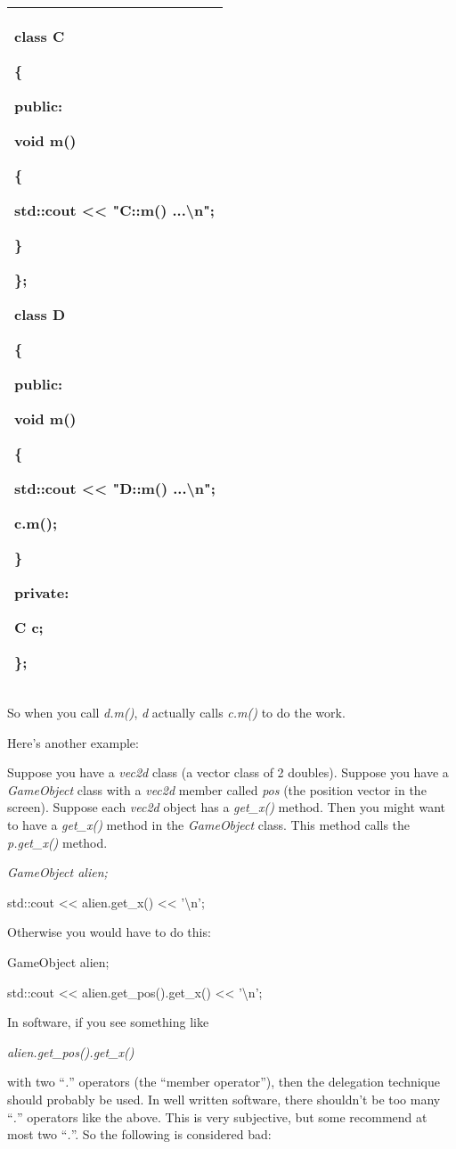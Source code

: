 \documentclass[
]{article}
\begin{document}
\begin{longtable}[]{@{}l@{}}
\toprule
\endhead
\begin{minipage}[t]{0.97\columnwidth}\raggedright
class C

\{

public:

\textbf{void m() }

\{

std::cout \textless\textless{} "C::m() ...\textbackslash n";

\}

\};

class D

\{

public:

\textbf{void m()}

\{

std::cout \textless\textless{} "D::m() ...\textbackslash n";

\textbf{c.m(); }

\}

private:

C c;

\};\strut
\end{minipage}\tabularnewline
\bottomrule
\end{longtable}

So when you call \emph{d.m()}, \emph{d} actually calls \emph{c.m()} to
do the work.

Here's another example:

Suppose you have a \emph{vec2d} class (a vector class of 2 doubles).
Suppose you have a \emph{GameObject} class with a \emph{vec2d} member
called \emph{pos} (the position vector in the screen). Suppose each
\emph{vec2d} object has a \emph{get\_x()} method. Then you might want to
have a \emph{get\_x()} method in the \emph{GameObject} class. This
method calls the \emph{p.get\_x() }method.

\emph{GameObject alien; }

std::cout \textless\textless{} alien.get\_x() \textless\textless{}
'\textbackslash n';

Otherwise you would have to do this:

GameObject alien;

std::cout \textless\textless{} alien.get\_pos().get\_x()
\textless\textless{} '\textbackslash n';

In software, if you see something like

\emph{alien.get\_pos().get\_x() }

with two ``\emph{.}'' operators (the ``member operator''), then the
delegation technique should probably be used. In well written software,
there shouldn't be too many ``\emph{.}'' operators like the above. This
is very subjective, but some recommend at most two ``\emph{.}''. So the
following is considered bad:
\end{document}
